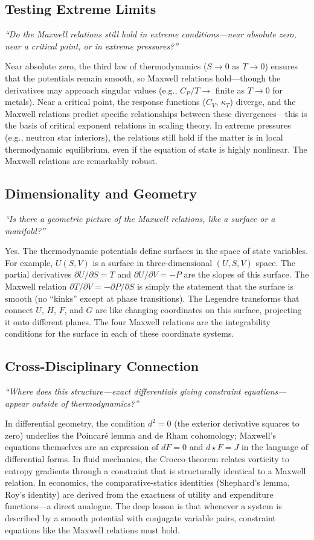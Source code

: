 \documentclass[11pt,openright]{book}
\begin{document}
\subsection*{Testing Extreme Limits}
\textit{``Do the Maxwell relations still hold in extreme conditions---near absolute zero, near a critical point, or in extreme pressures?''}

Near absolute zero, the third law of thermodynamics ($S \to 0$ as $T \to 0$) ensures that the potentials remain smooth, so Maxwell relations hold---though the derivatives may approach singular values (e.g., $C_{P}/T \to$ finite as $T \to 0$ for metals). Near a critical point, the response functions ($C_{V}$, $\kappa_{T}$) diverge, and the Maxwell relations predict specific relationships between these divergences---this is the basis of critical exponent relations in scaling theory. In extreme pressures (e.g., neutron star interiors), the relations still hold if the matter is in local thermodynamic equilibrium, even if the equation of state is highly nonlinear. The Maxwell relations are remarkably robust.

\subsection*{Dimensionality and Geometry}
\textit{``Is there a geometric picture of the Maxwell relations, like a surface or a manifold?''}

Yes. The thermodynamic potentials define surfaces in the space of state variables. For example, $U(S,V)$ is a surface in three-dimensional $(U, S, V)$ space. The partial derivatives $\partial U/\partial S = T$ and $\partial U/\partial V = -P$ are the slopes of this surface. The Maxwell relation $\partial T/\partial V = -\partial P/\partial S$ is simply the statement that the surface is smooth (no ``kinks'' except at phase transitions). The Legendre transforms that connect $U$, $H$, $F$, and $G$ are like changing coordinates on this surface, projecting it onto different planes. The four Maxwell relations are the integrability conditions for the surface in each of these coordinate systems.

\subsection*{Cross-Disciplinary Connection}
\textit{``Where does this structure---exact differentials giving constraint equations---appear outside of thermodynamics?''}

In differential geometry, the condition $d^{2} = 0$ (the exterior derivative squares to zero) underlies the Poincaré lemma and de Rham cohomology; Maxwell's equations themselves are an expression of $dF = 0$ and $d{\star}F = J$ in the language of differential forms. In fluid mechanics, the Crocco theorem relates vorticity to entropy gradients through a constraint that is structurally identical to a Maxwell relation. In economics, the comparative-statics identities (Shephard's lemma, Roy's identity) are derived from the exactness of utility and expenditure functions---a direct analogue. The deep lesson is that whenever a system is described by a smooth potential with conjugate variable pairs, constraint equations like the Maxwell relations must hold.
\end{document}
